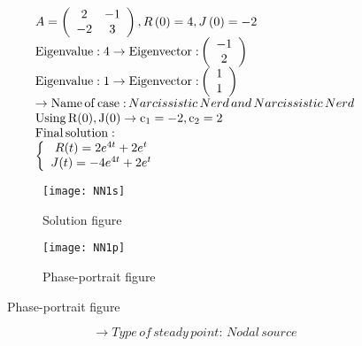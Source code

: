 \documentclass[a4paper]{article}
\begin{document}
\[\begin{array}{l}
A = \left( {\begin{array}{*{20}{c}}
2&{ - 1}\\
{ - 2}&3
\end{array}} \right),R\left( 0 \right) = 4,J\left( 0 \right) =  - 2\\
{\rm{Eigenvalue:4}} \to {\rm{Eigenvector:}}\left( {\begin{array}{*{20}{c}}
{ - 1}\\
2
\end{array}} \right)\\
{\rm{Eigenvalue:1}} \to {\rm{Eigenvector:}}\left( {\begin{array}{*{20}{c}}
1\\
1
\end{array}} \right)\\
 \to {\rm{Name}}\,{\rm{of}}\,{\rm{case:}}\,Narcissistic\,Nerd\,and\,Narcissistic\,Nerd\\
{\rm{Using}}\,{\rm{R(0), J(0)}} \to {{\rm{c}}_1} =  - 2,{\rm{ }}{{\rm{c}}_2} = 2\\
{\rm{Final}}\,{\rm{solution:}}\\
\left\{ {\begin{array}{*{20}{c}}
{R(t) = 2{e^{4t}} + 2{e^t}}\\
{J(t) =  - 4{e^{4t}} + 2{e^t}}
\end{array}} \right.
\end{array}\]
\begin{figure}[H]
\centering
\begin{subfigure}{.5\textwidth}
  \centering
  \texttt{[image: NN1s]}
  \caption*{Solution figure}
\end{subfigure}%
\begin{subfigure}{.5\textwidth}
  \centering
  \texttt{[image: NN1p]}
  \caption*{Phase-portrait figure}
\end{subfigure}
\end{figure}
\[  \to  Type\,of\,steady\,point:\,Nodal\,source\]
\end{document}
